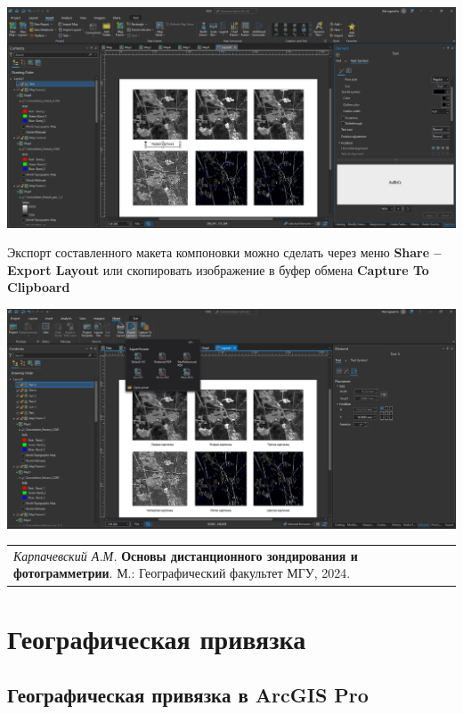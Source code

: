 \documentclass[
  12pt,
]{book}
\begin{document}
\includegraphics{images/Ref01/Graphic_Elements.png}

Экспорт составленного макета компоновки можно сделать через меню \textbf{Share -- Export Layout} или скопировать изображение в буфер обмена \textbf{Capture To Clipboard}

\includegraphics{images/Ref01/Export.png}

\begin{longtable}[]{@{}l@{}}
\toprule\noalign{}
\endhead
\bottomrule\noalign{}
\endlastfoot
\emph{Карпачевский А.М.} \textbf{Основы дистанционного зондирования и фотограмметрии}. М.: Географический факультет МГУ, 2024. \\
\end{longtable}

\hypertarget{georeference}{%
\chapter{Географическая привязка}\label{georeference}}

\hypertarget{georeference-arcgis}{%
\section{Географическая привязка в ArcGIS Pro}\label{georeference-arcgis}}
\end{document}

